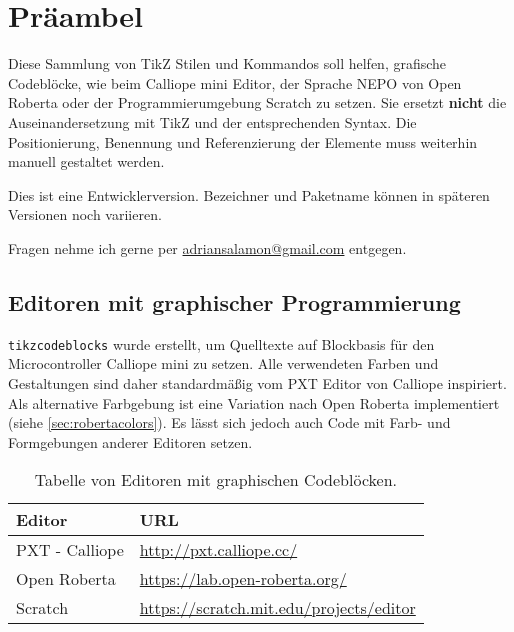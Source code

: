\documentclass[12pt,a4paper]{ltxdoc}
\begin{document}
  
\section{Präambel}

Diese Sammlung von TikZ Stilen und Kommandos soll helfen, grafische Codeblöcke, wie beim Calliope mini Editor, der Sprache NEPO von Open Roberta oder der Programmierumgebung Scratch zu setzen. Sie ersetzt \textbf{nicht} die Auseinandersetzung mit TikZ und der entsprechenden Syntax. Die Positionierung, Benennung und Referenzierung der Elemente muss weiterhin manuell gestaltet werden.

Dies ist eine Entwicklerversion. Bezeichner und Paketname können in späteren Versionen noch variieren.

Fragen nehme ich gerne per \href{mailto:adriansalamon@gmail.com?subject=Question for tikzcodeblocks}{adriansalamon@gmail.com} entgegen. 


\subsection{Editoren mit graphischer Programmierung}

\texttt{tikzcodeblocks} wurde erstellt, um Quelltexte auf Blockbasis für den Microcontroller Calliope mini zu setzen. Alle verwendeten Farben und Gestaltungen sind daher standardmäßig vom PXT Editor von Calliope inspiriert. Als alternative Farbgebung ist eine Variation nach Open Roberta implementiert (siehe \ref{sec:robertacolors}). Es lässt sich jedoch auch Code mit Farb- und Formgebungen anderer Editoren setzen.

\begin{table}[hbt!]\centering
\begin{tabular}{ll}
	\toprule
	Editor & URL \\ \midrule

	PXT - Calliope 	& 	\url{http://pxt.calliope.cc/} 				\\
	Open Roberta 		& 	\url{https://lab.open-roberta.org/} 	\\
	Scratch 				& 	\url{https://scratch.mit.edu/projects/editor} 			\\
	\bottomrule
\end{tabular}
\caption{Tabelle von Editoren mit graphischen Codeblöcken.}
\end{table}
\end{document}
